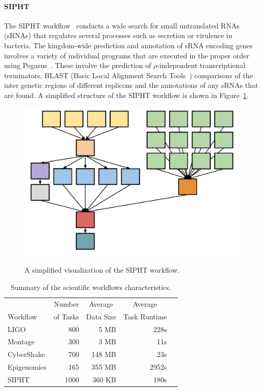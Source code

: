 \paragraph{\textbf{SIPHT}}
The SIPHT workflow~\cite{SIPHT} conducts a wide search for small untranslated RNAs (sRNAs) that regulates several processes such as secretion or virulence in bacteria. The kingdom-wide prediction and annotation of sRNA encoding genes involves a variety of individual programs that are executed in the proper order using Pegasus~\cite{Deelman2004}. These involve the prediction of $\rho$-independent transcriptional terminators, BLAST (Basic Local Alignment Search Tools~\cite{BLAST}) comparisons of the inter genetic regions of different replicons and the annotations of any sRNAs that are found. A simplified structure of the SIPHT workflow is shown in Figure~\ref{fig:evaluation_shape_sipht}. 

\begin{figure}[htb]
	\centering
	\includegraphics[width=0.7\linewidth]{figure18.pdf} \\
	\caption{A simplified visualization of the SIPHT workflow.}
	\label{fig:evaluation_shape_sipht}
\end{figure}


\begin{table}[!htb]
	\setlength{\tabcolsep}{11pt}
	\centering
	\small
	\begin{tabular}{lrrrr}
		\hline
		 & \multicolumn{1}{c}{Number} & \multicolumn{1}{c}{Average} &  \multicolumn{1}{c}{Average} \\
		Workflow	& of Tasks	 & Data Size & Task Runtime \\
		\hline
		LIGO 		&800		& 5 MB	& 228s\\
		Montage 		&300		&3 MB	&11s\\
		CyberShake 	&700		&148 MB 	& 23s\\
		Epigenomics 	&165 	& 355 MB	& 2952s\\
		SIPHT		&1000	& 360 KB 	& 180s\\
		\hline
	\end{tabular}
	\caption{Summary of the scientific workflows characteristics.}
	\label{tab:evaluation_workflows}
\end{table} 

